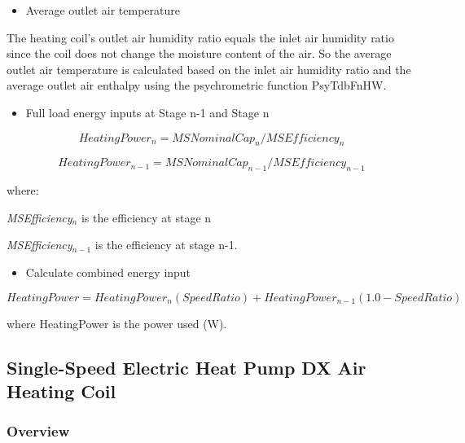 \begin{itemize}
  \item Average outlet air temperature
\end{itemize}

    The heating coil's outlet air humidity ratio equals the inlet air humidity ratio since the coil does not change the moisture content of the air. So the average outlet air temperature is calculated based on the inlet air humidity ratio and the average outlet air enthalpy using the psychrometric function PsyTdbFnHW.

\begin{itemize}
  \item
    Full load energy inputs at Stage n-1 and Stage n
\end{itemize}

\begin{equation}
HeatingPowe{r_n} = MSNominalCa{p_n}/MSEfficienc{y_n}
\end{equation}

\begin{equation}
HeatingPowe{r_{n - 1}} = MSNominalCa{p_{n - 1}}/MSEfficienc{y_{n - 1}}
\end{equation}

where:

\emph{MSEfficiency\(_{n}\)} is the efficiency at stage n

\emph{MSEfficiency\(_{n-1}\)} is the efficiency at stage n-1.

\begin{itemize}
  \item Calculate combined energy input
\end{itemize}

\begin{equation}
HeatingPower = HeatingPowe{r_n}\left( {SpeedRatio} \right) + HeatingPowe{r_{n - 1}}(1.0 - SpeedRatio)
\end{equation}

where HeatingPower is the power used (W).

\subsection{Single-Speed Electric Heat Pump DX Air Heating Coil}\label{single-speed-electric-heat-pump-dx-air-heating-coil}

\subsubsection{Overview}\label{overview-6-000}


